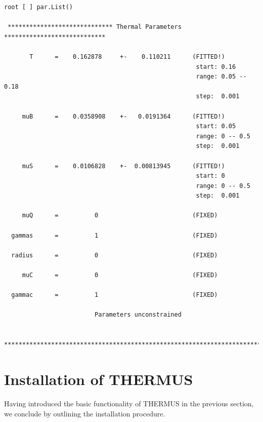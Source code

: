 \documentclass{elsarticle}
\begin{document}
\small
\begin{verbatim}
root [ ] par.List()

 ***************************** Thermal Parameters ****************************

       T      =    0.162878     +-    0.110211      (FITTED!)
                                                     start: 0.16
                                                     range: 0.05 -- 0.18
                                                     step:  0.001

     muB      =    0.0358908    +-   0.0191364      (FITTED!)
                                                     start: 0.05
                                                     range: 0 -- 0.5
                                                     step:  0.001

     muS      =    0.0106828    +-  0.00813945      (FITTED!)
                                                     start: 0
                                                     range: 0 -- 0.5
                                                     step:  0.001

     muQ      =          0                          (FIXED)

  gammas      =          1                          (FIXED)

  radius      =          0                          (FIXED)

     muC      =          0                          (FIXED)

  gammac      =          1                          (FIXED)

                         Parameters unconstrained

  ******************************************************************************

\end{verbatim}
\normalsize


\section{Installation of THERMUS}

Having introduced the basic functionality of THERMUS in the previous section, 
we conclude by outlining the installation procedure.\\
\end{document}
